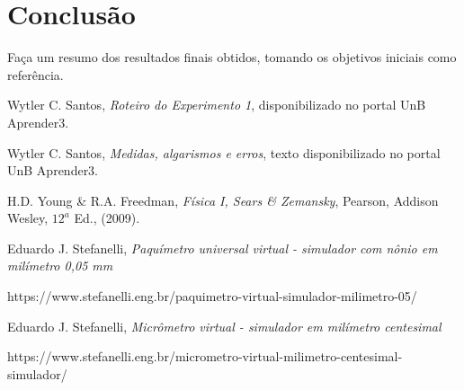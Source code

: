 \documentclass[12pt,a4paper]{article}
\begin{document}
\section{Conclusão}
Faça um resumo dos resultados finais obtidos, tomando os objetivos iniciais como referência.

\begin{thebibliography}{}
%

 Wytler C. Santos, {\it Roteiro do Experimento 1}, disponibilizado no portal UnB Aprender3.

 Wytler C. Santos, {\it Medidas, algarismos e erros}, texto disponibilizado no portal UnB Aprender3.

 H.D. Young \& R.A. Freedman, {\it Física I, Sears \& Zemansky}, Pearson, Addison Wesley, $12^a$ Ed., (2009).

 Eduardo J. Stefanelli, {\it Paquímetro universal virtual - simulador com nônio em milímetro 0,05 mm}

https://www.stefanelli.eng.br/paquimetro-virtual-simulador-milimetro-05/

 Eduardo J. Stefanelli, {\it Micrômetro virtual - simulador em milímetro centesimal}

https://www.stefanelli.eng.br/micrometro-virtual-milimetro-centesimal-simulador/




\end{thebibliography}




\end{document}
